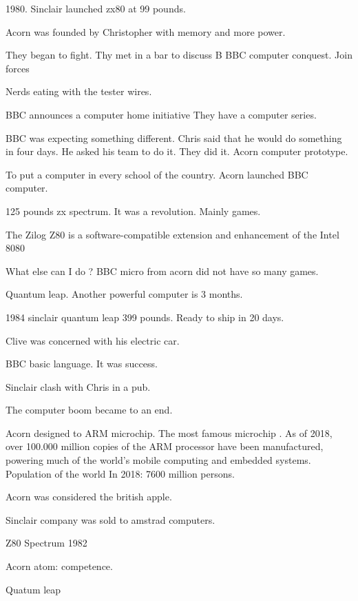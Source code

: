    1980. Sinclair launched zx80 at 99 pounds. 
   
   Acorn was founded by Christopher with memory and more power. 
   
   They began to fight. Thy met in a bar to discuss B BBC computer conquest. Join forces 
   
   Nerds eating with the tester wires.
   
   
   BBC announces a computer home initiative 
   They have a computer series. 
   
   BBC was expecting something different. Chris said that he would do something in four days. 
   He asked his team to do it. They did it. Acorn computer prototype. 
   
   To put a computer in every school of the country. 
   Acorn launched BBC computer. 
   
   125 pounds zx spectrum. 
   It was a revolution. 
   Mainly games. 
   
   The Zilog Z80 is a software-compatible extension and enhancement of the Intel 8080 
   
   What else can I do ? 
   BBC micro from acorn did not have so many games. 
   
   Quantum leap. Another powerful computer is 3 months. 
   
   1984 sinclair quantum leap 399 pounds. Ready to ship in 20 days. 
   
   Clive was concerned with his electric car. 
   
   BBC basic language. It was success. 
   
   
   Sinclair clash with Chris in a pub. 
   
   The computer boom became to an end. 
   
   Acorn designed to ARM microchip. The most famous microchip . 
   As of 2018, over 100.000 million copies of the ARM processor have been manufactured, powering much of the world's mobile computing and 
   embedded systems. Population of the world 
   In 2018: 7600 million persons. 
    
   
   Acorn was considered the british apple. 
   
   Sinclair company was sold to amstrad computers. 
   
   
    
   Z80
   Spectrum 1982 
   
   Acorn atom: competence. 
   
   
   
   Quatum leap 
   
